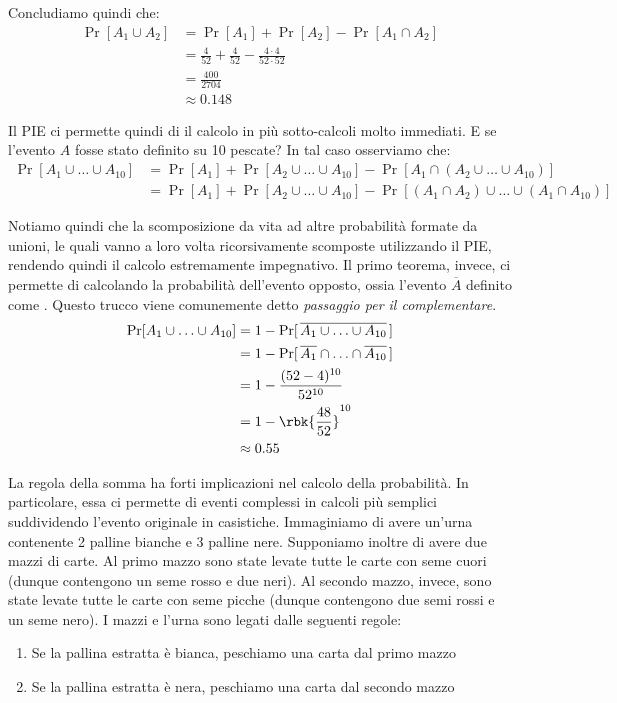 \documentclass[a4paper, 12pt]{report}
\begin{document}
    Concludiamo quindi che:
    \[\begin{split}
        \Pr[A_1 \cup A_2] &= \Pr[A_1] + \Pr[A_2] - \Pr[A_1 \cap A_2] \\
        &= \frac{4}{52} + \frac{4}{52} - \frac{4 \cdot 4}{52 \cdot 52} \\
        &= \frac{400}{2704}\\
        &\approx 0.148
    \end{split}\]

    Il PIE ci permette quindi di  il calcolo in più sotto-calcoli molto immediati. E se l'evento $A$ fosse stato definito su 10 pescate? In tal caso osserviamo che:
    \[\begin{split}
        \Pr[A_1 \cup \ldots \cup A_{10}] &= \Pr[A_1] + \Pr[A_2 \cup \ldots \cup A_{10}] - \Pr[A_1 \cap (A_2 \cup \ldots \cup A_{10})] \\
        &= \Pr[A_1] + \Pr[A_2 \cup \ldots \cup A_{10}] - \Pr[(A_1 \cap A_2) \cup \ldots \cup (A_1 \cap A_{10})]
    \end{split}\]

    Notiamo quindi che la scomposizione da vita ad altre probabilità formate da unioni, le quali vanno a loro volta ricorsivamente scomposte utilizzando il PIE, rendendo quindi il calcolo estremamente impegnativo. Il primo teorema, invece, ci permette di  calcolando la probabilità dell'evento opposto, ossia l'evento $\overline{A}$ definito come . 
    Questo trucco viene comunemente detto \textit{passaggio per il complementare}.
    \[\begin{split}
        \Pr[A_1 \cup \ldots \cup A_{10}] &= 1 - \Pr[\, \overline{A_1 \cup \ldots \cup A_{10}} \,] \\
        &= 1 - \Pr[\,\overline{A_1} \cap \ldots \cap \overline{A_{10}} \,] \\
        &= 1 - \frac{(52-4)^{10}}{52^{10}} \\
        &= 1 - \rbk{\frac{48}{52}}^{10} \\
        &\approx 0.55
    \end{split}\]


    La regola della somma ha forti implicazioni nel calcolo della probabilità. In particolare, essa ci permette di  eventi complessi in calcoli più semplici suddividendo l'evento originale in casistiche. Immaginiamo di avere un'urna contenente 2 palline bianche e 3 palline nere. Supponiamo inoltre di avere due mazzi di carte. Al primo mazzo sono state levate tutte le carte con seme cuori (dunque contengono un seme rosso e due neri). Al secondo mazzo, invece, sono state levate tutte le carte con seme picche (dunque contengono due semi rossi e un seme nero). I mazzi e l'urna sono legati dalle seguenti regole:
    \begin{enumerate}
        \item Se la pallina estratta è bianca, peschiamo una carta dal primo mazzo
        \item Se la pallina estratta è nera, peschiamo una carta dal secondo mazzo
    \end{enumerate}
\end{document}
